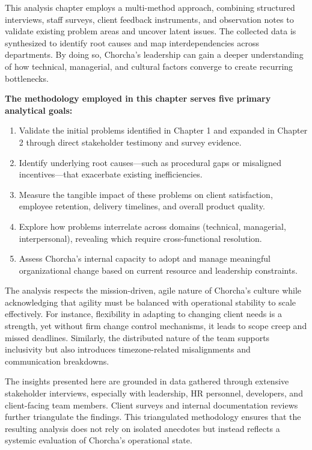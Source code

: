 \documentclass[12pt,a4paper,oneside]{book}
\begin{document}
This analysis chapter employs a multi-method approach, combining structured interviews, staff surveys, client feedback instruments, and observation notes to validate existing problem areas and uncover latent issues. The collected data is synthesized to identify root causes and map interdependencies across departments. By doing so, Chorcha's leadership can gain a deeper understanding of how technical, managerial, and cultural factors converge to create recurring bottlenecks.

\textbf{The methodology employed in this chapter serves five primary analytical goals:}
\begin{enumerate}
    \item Validate the initial problems identified in Chapter 1 and expanded in Chapter 2 through direct stakeholder testimony and survey evidence.
    \item Identify underlying root causes—such as procedural gaps or misaligned incentives—that exacerbate existing inefficiencies.
    \item Measure the tangible impact of these problems on client satisfaction, employee retention, delivery timelines, and overall product quality.
    \item Explore how problems interrelate across domains (technical, managerial, interpersonal), revealing which require cross-functional resolution.
    \item Assess Chorcha’s internal capacity to adopt and manage meaningful organizational change based on current resource and leadership constraints.
\end{enumerate}

The analysis respects the mission-driven, agile nature of Chorcha’s culture while acknowledging that agility must be balanced with operational stability to scale effectively. For instance, flexibility in adapting to changing client needs is a strength, yet without firm change control mechanisms, it leads to scope creep and missed deadlines. Similarly, the distributed nature of the team supports inclusivity but also introduces timezone-related misalignments and communication breakdowns.

The insights presented here are grounded in data gathered through extensive stakeholder interviews, especially with leadership, HR personnel, developers, and client-facing team members. Client surveys and internal documentation reviews further triangulate the findings. This triangulated methodology ensures that the resulting analysis does not rely on isolated anecdotes but instead reflects a systemic evaluation of Chorcha’s operational state.
\end{document}
